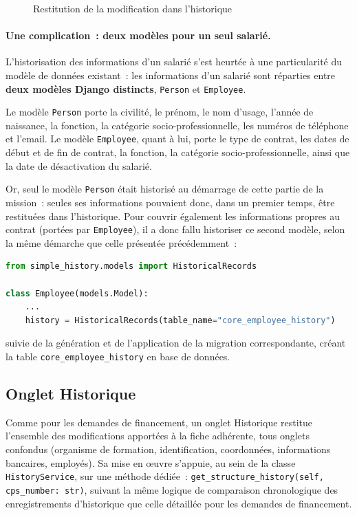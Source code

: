\begin{figure}[H]
  \centering
  \caption{Restitution de la modification dans l'historique}
  \label{fig:modif-salarie-hist}
\end{figure}

\paragraph{Une complication~: deux modèles pour un seul salarié.}
L'historisation des informations d'un salarié s'est heurtée à une
particularité du modèle de données existant~: les informations d'un
salarié sont réparties entre \textbf{deux modèles Django distincts},
\texttt{Person} et \texttt{Employee}.

Le modèle \texttt{Person} porte la civilité, le prénom, le nom d'usage,
l'année de naissance, la fonction, la catégorie socio-professionnelle,
les numéros de téléphone et l'email. Le modèle \texttt{Employee}, quant à
lui, porte le type de contrat, les dates de début et de fin de contrat,
la fonction, la catégorie socio-professionnelle, ainsi que la date de
désactivation du salarié.

Or, seul le modèle \texttt{Person} était historisé au démarrage de cette
partie de la mission~: seules ses informations pouvaient donc, dans un
premier temps, être restituées dans l'historique. Pour couvrir également
les informations propres au contrat (portées par \texttt{Employee}), il a
donc fallu historiser ce second modèle, selon la même démarche que celle
présentée précédemment~:

\begin{lstlisting}[language=Python, caption={Historisation du modèle \texttt{Employee}}]
from simple_history.models import HistoricalRecords

class Employee(models.Model):
    ...
    history = HistoricalRecords(table_name="core_employee_history")
\end{lstlisting}

suivie de la génération et de l'application de la migration
correspondante, créant la table \texttt{core\_employee\_history} en base
de données.

\subsection{Onglet Historique}

Comme pour les demandes de financement, un onglet Historique restitue
l'ensemble des modifications apportées à la fiche adhérente, tous
onglets confondus (organisme de formation, identification, coordonnées,
informations bancaires, employés). Sa mise en œuvre s'appuie, au sein de
la classe \texttt{HistoryService}, sur une méthode dédiée~:
\texttt{get\_structure\_history(self, cps\_number: str)}, suivant la même
logique de comparaison chronologique des enregistrements d'historique
que celle détaillée pour les demandes de financement.

